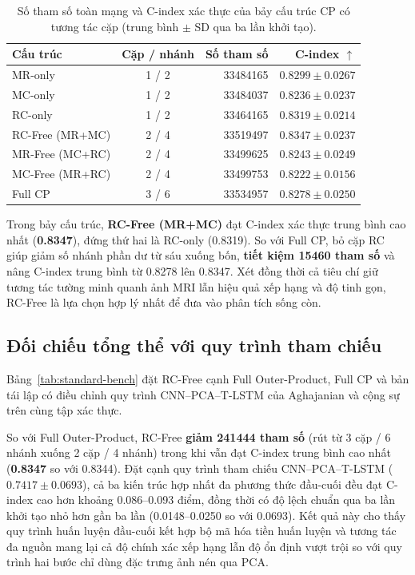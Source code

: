 \begin{table}[H]
\centering\small
\caption[So sánh bảy cấu trúc có tương tác cặp]{Số tham số toàn mạng và C-index xác thực của bảy cấu trúc CP có tương tác cặp (trung bình $\pm$ SD qua ba lần khởi tạo).}
\label{tab:new-topology}
\begin{tabularx}{\linewidth}{@{}Y c r r@{}}
\toprule
\textbf{Cấu trúc} & \textbf{Cặp / nhánh} & \textbf{Số tham số} & \textbf{C-index $\uparrow$} \\
\midrule
MR-only & 1 / 2 & 33484165 & $0.8299\pm0.0267$ \\
MC-only & 1 / 2 & 33484037 & $0.8236\pm0.0237$ \\
RC-only & 1 / 2 & 33464165 & $0.8319\pm0.0214$ \\
RC-Free (MR+MC) & 2 / 4 & 33519497 & $\mathbf{0.8347\pm0.0237}$ \\
MR-Free (MC+RC) & 2 / 4 & 33499625 & $0.8243\pm0.0249$ \\
MC-Free (MR+RC) & 2 / 4 & 33499753 & $0.8222\pm0.0156$ \\
Full CP & 3 / 6 & 33534957 & $0.8278\pm0.0250$ \\
\bottomrule
\end{tabularx}
\end{table}

Trong bảy cấu trúc, \textbf{RC-Free (MR+MC)} đạt C-index xác thực trung bình cao nhất (\textbf{0.8347}), đứng thứ hai là RC-only (0.8319). So với Full CP, bỏ cặp RC giúp giảm số nhánh phần dư từ sáu xuống bốn, \textbf{tiết kiệm 15460 tham số} và nâng C-index trung bình từ 0.8278 lên 0.8347. Xét đồng thời cả tiêu chí giữ tương tác tường minh quanh ảnh MRI lẫn hiệu quả xếp hạng và độ tinh gọn, RC-Free là lựa chọn hợp lý nhất để đưa vào phân tích sống còn.

\subsection{Đối chiếu tổng thể với quy trình tham chiếu}
Bảng~\ref{tab:standard-bench} đặt RC-Free cạnh Full Outer-Product, Full CP và bản tái lập có điều chỉnh quy trình CNN--PCA--T-LSTM của Aghajanian và cộng sự trên cùng tập xác thực.



So với Full Outer-Product, RC-Free \textbf{giảm 241444 tham số} (rút từ 3 cặp / 6 nhánh xuống 2 cặp / 4 nhánh) trong khi vẫn đạt C-index trung bình cao nhất (\textbf{0.8347} so với 0.8344). Đặt cạnh quy trình tham chiếu CNN--PCA--T-LSTM ($0.7417\pm0.0693$), cả ba kiến trúc hợp nhất đa phương thức đầu-cuối đều đạt C-index cao hơn khoảng 0.086--0.093 điểm, đồng thời có độ lệch chuẩn qua ba lần khởi tạo nhỏ hơn gần ba lần (0.0148--0.0250 so với 0.0693). Kết quả này cho thấy quy trình huấn luyện đầu-cuối kết hợp bộ mã hóa tiền huấn luyện và tương tác đa nguồn mang lại cả độ chính xác xếp hạng lẫn độ ổn định vượt trội so với quy trình hai bước chỉ dùng đặc trưng ảnh nén qua PCA.

